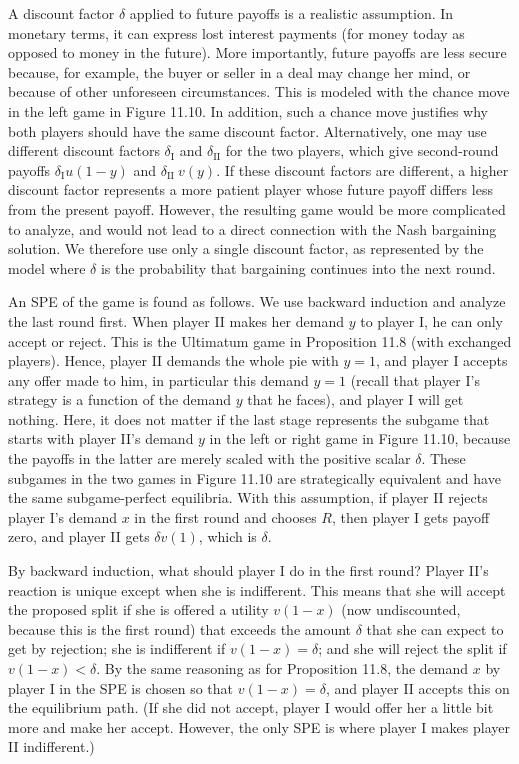 \documentclass[12pt]{article}
\begin{document}
A discount factor $\delta$ applied to future payoffs is a realistic assumption. In monetary terms, it can express lost interest payments (for money today as opposed to money in the future). More importantly, future payoffs are less secure because, for example, the buyer or seller in a deal may change her mind, or because of other unforeseen circumstances. This is modeled with the chance move in the left game in Figure 11.10. In addition, such a chance move justifies why both players should have the same discount factor. Alternatively, one may use different discount factors $\delta_{\mathrm{I}}$ and $\delta_{\mathrm{II}}$ for the two players, which give second-round payoffs $\delta_{\mathrm{I}} u(1-y)$ and $\delta_{\text {II }} v(y)$. If these discount factors are different, a higher discount factor represents a more patient player whose future payoff differs less from the present payoff. However, the resulting game would be more complicated to analyze, and would not lead to a direct connection with the Nash bargaining solution. We therefore use only a single discount factor, as represented by the model where $\delta$ is the probability that bargaining continues into the next round.

An SPE of the game is found as follows. We use backward induction and analyze the last round first. When player II makes her demand $y$ to player I, he can only accept or reject. This is the Ultimatum game in Proposition 11.8 (with exchanged players). Hence, player II demands the whole pie with $y=1$, and player I accepts any offer made to him, in particular this demand $y=1$ (recall that player I's strategy is a function of the demand $y$ that he faces), and player I will get nothing. Here, it does not matter if the last stage represents the subgame that starts with player II's demand $y$ in the left or right game in Figure 11.10, because the payoffs in the latter are merely scaled with the positive scalar $\delta$. These subgames in the two games in Figure 11.10 are strategically equivalent and have the same subgame-perfect equilibria. With this assumption, if player II rejects player I's demand $x$ in the first round and chooses $R$, then player I gets payoff zero, and player II gets $\delta v(1)$, which is $\delta$.

By backward induction, what should player I do in the first round? Player II's reaction is unique except when she is indifferent. This means that she will accept the proposed split if she is offered a utility $v(1-x)$ (now undiscounted, because this is the first round) that exceeds the amount $\delta$ that she can expect to get by rejection; she is indifferent if $v(1-x)=\delta$; and she will reject the split if $v(1-x)<\delta$. By the same reasoning as for Proposition 11.8, the demand $x$ by player I in the SPE is chosen so that $v(1-x)=\delta$, and player II accepts this on the equilibrium path. (If she did not accept, player I would offer her a little bit more and make her accept. However, the only SPE is where player I makes player II indifferent.)
\end{document}
